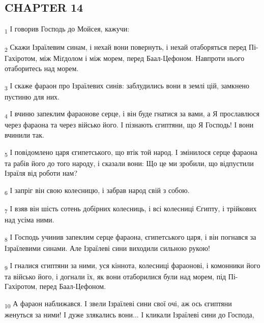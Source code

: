 \subsection{CHAPTER 14}
\begin{tcolorbox}
\textsubscript{1} І говорив Господь до Мойсея, кажучи:
\end{tcolorbox}
\begin{tcolorbox}
\textsubscript{2} Скажи Ізраїлевим синам, і нехай вони повернуть, і нехай отаборяться перед Пі-Гахіротом, між Міґдолом і між морем, перед Баал-Цефоном. Навпроти нього отаборитесь над морем.
\end{tcolorbox}
\begin{tcolorbox}
\textsubscript{3} І скаже фараон про Ізраїлевих синів: заблудились вони в землі цій, замкнено пустиню для них.
\end{tcolorbox}
\begin{tcolorbox}
\textsubscript{4} І вчиню запеклим фараонове серце, і він буде гнатися за вами, а Я прославлюся через фараона та через військо його. І пізнають єгиптяни, що Я Господь! І вони вчинили так.
\end{tcolorbox}
\begin{tcolorbox}
\textsubscript{5} І повідомлено царя єгипетського, що втік той народ. І змінилося серце фараона та рабів його до того народу, і сказали вони: Що це ми зробили, що відпустили Ізраїля від роботи нам?
\end{tcolorbox}
\begin{tcolorbox}
\textsubscript{6} І запріг він свою колесницю, і забрав народ свій з собою.
\end{tcolorbox}
\begin{tcolorbox}
\textsubscript{7} І взяв він шість сотень добірних колесниць, і всі колесниці Єгипту, і трійкових над усіма ними.
\end{tcolorbox}
\begin{tcolorbox}
\textsubscript{8} І Господь учинив запеклим серце фараона, єгипетського царя, і він погнався за Ізраїлевими синами. Але Ізраїлеві сини виходили сильною рукою!
\end{tcolorbox}
\begin{tcolorbox}
\textsubscript{9} І гналися єгиптяни за ними, уся кіннота, колесниці фараонові, і комонники його та військо його, і догнали їх, як вони отаборилися були над морем, під Пі-Гахіротом, перед Баал-Цефоном.
\end{tcolorbox}
\begin{tcolorbox}
\textsubscript{10} А фараон наближався. І звели Ізраїлеві сини свої очі, аж ось єгиптяни женуться за ними! І дуже злякались вони... І кликали Ізраїлеві сини до Господа,
\end{tcolorbox}
